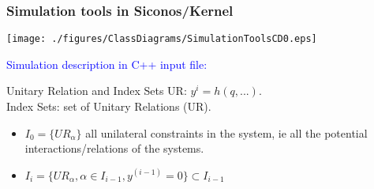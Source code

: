 \frame
{
\frametitle{Simulation tools in Siconos/Kernel}
  \begin{center}
     \texttt{[image: ./figures/ClassDiagrams/SimulationToolsCD0.eps]}
\end{center}
\pause
\vspace{0.5cm}\textcolor{blue}{Simulation description in C++ input file:} \\[3mm]
\pause
\begin{block}{Unitary Relation and Index Sets}
UR: $y^{i} = h(q, ...)$.  \\
Index Sets: set of Unitary Relations (UR).  
\begin{itemize}
\item $I_0 = \{ UR_\alpha \}$ all unilateral constraints in the system, ie all the potential interactions/relations of the systems. 
\item $I_i = \{ UR_\alpha, \alpha \in I_{i-1}, y^{(i-1)} = 0 \}\subset I_{i-1}$
\end{itemize}
\end{block}}

